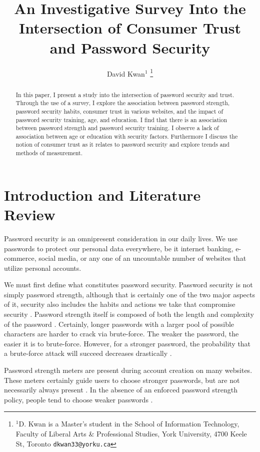 \documentclass[letterpaper, 10 pt, conference]{ieeeconf}  %
\title{\LARGE \bf
An Investigative Survey Into the Intersection of Consumer Trust and Password Security
}
\author{David Kwan$^{1}$%
\thanks{$^{1}$D. Kwan is a Master's student in the School of Information Technology, Faculty of Liberal Arts \& Professional Studies, York University, 4700 Keele St, Toronto
        {\tt\small dkwan33@yorku.ca}}%
}
\begin{document}
\maketitle
\thispagestyle{plain}
\pagestyle{plain}

\begin{abstract}

In this paper, I present a study into the intersection of password security and trust. Through the use of a survey, I explore the association between password strength, password security habits, consumer trust in various websites, and the impact of password security training, age, and education. I find that there is an association between password strength and password security training. I observe a lack of association between age or education with security factors. Furthermore I discuss the notion of consumer trust as it relates to password security and explore trends and methods of measurement.

\end{abstract}


\section{Introduction and Literature Review}

Password security is an omnipresent consideration in our daily lives. We use passwords to protect our personal data everywhere, be it internet banking, e-commerce, social media, or any one of an uncountable number of websites that utilize personal accounts. 

We must first define what constitutes password security. Password security is not simply password strength, although that is certainly one of the two major aspects of it, security also includes the habits and actions we take that compromise security \cite{Dhamija2000}. Password strength itself is composed of both the length and complexity of the password \cite{Morris1979}. Certainly, longer passwords with a larger pool of possible characters are harder to crack via brute-force. The weaker the password, the easier it is to brute-force. However, for a stronger password, the probability that a brute-force attack will succeed decreases drastically \cite{DellAmico2010}.

Password strength meters are present during account creation on many websites. These meters certainly guide users to choose stronger passwords, but are not necessarily always present \cite{DeCarnavalet2014}. In the absence of an enforced password strength policy, people tend to choose weaker passwords \cite{DellAmico2010}. 
\end{document}
